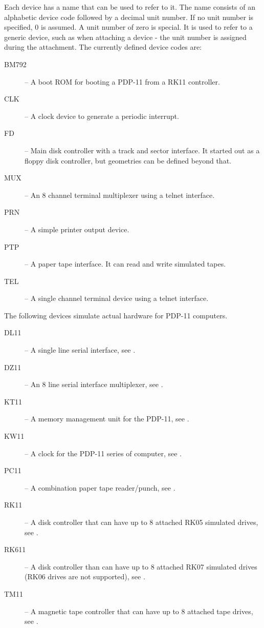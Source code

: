 \documentclass[10pt, openany]{book}
\begin{document}
Each device has a name that can be used to refer to it.
The name consists of an alphabetic device code followed by a decimal unit number.
If no unit number is specified, 0 is assumed.  A unit number of zero is special.
It is used to refer to a generic device, such as when attaching a device - the unit number is assigned during the attachment.
The currently defined device codes are:
\begin{description}
  \item[BM792] -- A boot ROM for booting a PDP-11 from a RK11 controller.
  \item[CLK] -- A clock device to generate a periodic interrupt.
  \item[FD] -- Main disk controller with a track and sector interface.  It started out as a floppy disk controller, but geometries can be defined beyond that.
  \item[MUX] -- An 8 channel terminal multiplexer using a telnet interface.
  \item[PRN] -- A simple printer output device.
  \item[PTP] -- A paper tape interface.  It can read and write simulated tapes.
  \item[TEL] -- A single channel terminal device using a telnet interface.
\end{description}
The following devices simulate actual hardware for PDP-11 computers.
\begin{description}
  \item[DL11] --  A single line serial interface, see \cite{DL11}.
  \item[DZ11] -- An 8 line serial interface multiplexer, see \cite{DZ11}.
  \item[KT11] -- A memory management unit for the PDP-11, see \cite{KT11}.
  \item[KW11] -- A clock for the PDP-11 series of computer, see \cite{KW11L}.
  \item[PC11] -- A combination paper tape reader/punch, see \cite{PC11}.
  \item[RK11] -- A disk controller that can have up to 8 attached RK05 simulated drives, see \cite{RK11}.
  \item[RK611] -- A disk controller than can have up to 8 attached RK07 simulated drives (RK06 drives are not supported), see \cite{RK611}.
  \item[TM11] -- A magnetic tape controller that can have up to 8 attached tape drives, see \cite{TM11}.
\end{description}
\end{document}
